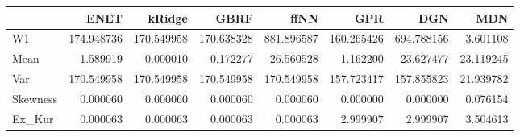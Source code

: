 \begin{tabular}{lrrrrrrr}
\toprule
{} &        ENET &      kRidge &        GBRF &        ffNN &         GPR &         DGN &        MDN \\
\midrule
W1       &  174.948736 &  170.549958 &  170.638328 &  881.896587 &  160.265426 &  694.788156 &   3.601108 \\
Mean     &    1.589919 &    0.000010 &    0.172277 &   26.560528 &    1.162200 &   23.627477 &  23.119245 \\
Var      &  170.549958 &  170.549958 &  170.549958 &  170.549958 &  157.723417 &  157.855823 &  21.939782 \\
Skewness &    0.000060 &    0.000060 &    0.000060 &    0.000060 &    0.000000 &    0.000000 &   0.076154 \\
Ex\_Kur   &    0.000063 &    0.000063 &    0.000063 &    0.000063 &    2.999907 &    2.999907 &   3.504613 \\
\bottomrule
\end{tabular}

